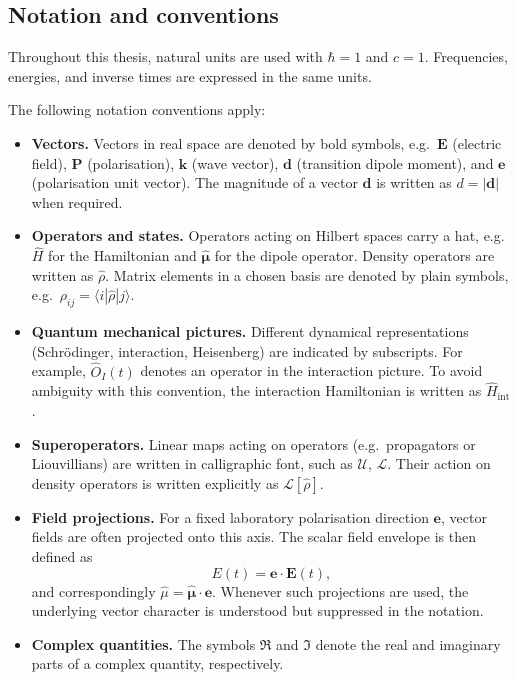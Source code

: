 \clearpage
\subsection*{Notation and conventions}

Throughout this thesis, natural units are used with $\hbar = 1$ and $c = 1$.
Frequencies, energies, and inverse times are expressed in the same units.

The following notation conventions apply:

\begin{itemize}

\item \textbf{Vectors.}
Vectors in real space are denoted by bold symbols, e.g.\ $\boldsymbol{E}$ (electric field), $\boldsymbol{P}$ (polarisation), $\boldsymbol{k}$ (wave vector), $\boldsymbol{d}$ (transition dipole moment), and $\boldsymbol{e}$ (polarisation unit vector). 
The magnitude of a vector $\boldsymbol{d}$ is written as $d = |\boldsymbol{d}|$ when required.

\item \textbf{Operators and states.}
Operators acting on Hilbert spaces carry a hat, e.g.\ $\hat{H}$ for the Hamiltonian and $\hat{\boldsymbol{\mu}}$ for the dipole operator. 
Density operators are written as $\hat{\rho}$. 
Matrix elements in a chosen basis are denoted by plain symbols, e.g.\ $\rho_{ij} = \langle i | \hat{\rho} | j \rangle$.

\item \textbf{Quantum mechanical pictures.}
Different dynamical representations (Schr\"odinger, interaction, Heisenberg) are indicated by subscripts. 
For example, $\hat{O}_I(t)$ denotes an operator in the interaction picture. 
To avoid ambiguity with this convention, the interaction Hamiltonian is written as $\hat{H}_{\mathrm{int}}$.

\item \textbf{Superoperators.}
Linear maps acting on operators (e.g.\ propagators or Liouvillians) are written in calligraphic font, such as $\mathcal{U}$, $\mathcal{L}$. 
Their action on density operators is written explicitly as $\mathcal{L}[\hat{\rho}]$.

\item \textbf{Field projections.}
For a fixed laboratory polarisation direction $\boldsymbol{e}$, vector fields are often projected onto this axis. 
The scalar field envelope is then defined as
\[
E(t) = \boldsymbol{e} \cdot \boldsymbol{E}(t),
\]
and correspondingly $\hat{\mu} = \hat{\boldsymbol{\mu}} \cdot \boldsymbol{e}$. 
Whenever such projections are used, the underlying vector character is understood but suppressed in the notation.

\item \textbf{Complex quantities.}
The symbols $\Re$ and $\Im$ denote the real and imaginary parts of a complex quantity, respectively.

\end{itemize}


